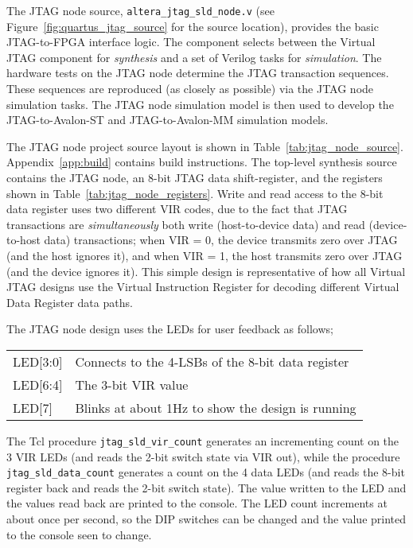 \documentclass[10pt,twoside]{article}
\begin{document}
The JTAG node source, \verb+altera_jtag_sld_node.v+ (see 
Figure~\ref{fig:quartus_jtag_source} for the source location),
provides the basic JTAG-to-FPGA interface logic. The component
selects between the Virtual JTAG component for {\em synthesis}
and a set of Verilog tasks for {\em simulation}. 
The hardware tests on the JTAG node determine the JTAG transaction
sequences. These sequences are reproduced (as closely as possible)
via the JTAG node simulation tasks. The JTAG node simulation model
is then used to develop the JTAG-to-Avalon-ST and JTAG-to-Avalon-MM
simulation models.

The JTAG node project source layout is shown in Table~\ref{tab:jtag_node_source}.
Appendix~\ref{app:build} contains build instructions.
The top-level synthesis source contains the JTAG node, an 8-bit JTAG
data shift-register, and the registers shown in
Table~\ref{tab:jtag_node_registers}. Write and read access to the 8-bit
data register uses two different VIR codes, due to the fact that JTAG
transactions are {\em simultaneously} both write (host-to-device data)
and read (device-to-host data) transactions; when VIR = 0, the
device transmits zero over JTAG (and the host ignores it),
and when VIR = 1, the host transmits zero over JTAG (and the
device ignores it). This simple design is representative of how
all Virtual JTAG designs use the Virtual Instruction Register for
decoding different Virtual Data Register data paths.

\newpage
The JTAG node design uses the LEDs for user feedback as follows;
%
\begin{center}
\begin{tabular}{ll}
LED[3:0] & Connects to the 4-LSBs of the 8-bit data register\\
LED[6:4] & The 3-bit VIR value\\
LED[7]   & Blinks at about 1Hz to show the design is running\\
\end{tabular}
\end{center}
%
The Tcl procedure \verb+jtag_sld_vir_count+ generates an incrementing
count on the 3 VIR LEDs (and reads the 2-bit switch state via VIR out),
while the procedure \verb+jtag_sld_data_count+
generates a count on the 4 data LEDs (and reads the 8-bit register
back and reads the 2-bit switch state). The value written to the
LED and the values read back are printed to the console. The LED 
count increments at about once per second, so the DIP switches can
be changed and the value printed to the console seen to change.
\end{document}
